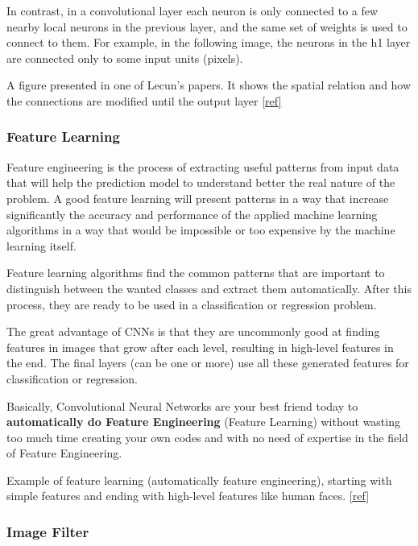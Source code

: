 \documentclass[11pt]{article}
\begin{document}
In contrast, in a convolutional layer each neuron is only connected to a
few nearby local neurons in the previous layer, and the same set of
weights is used to connect to them. For example, in the following image,
the neurons in the h1 layer are connected only to some input units
(pixels).

A figure presented in one of Lecun's papers. It shows the spatial
relation and how the connections are modified until the output layer
\href{http://help.sketchup.com/en}{{[}ref{]}} 

    \subsubsection{Feature Learning}\label{feature-learning}

Feature engineering is the process of extracting useful patterns from
input data that will help the prediction model to understand better the
real nature of the problem. A good feature learning will present
patterns in a way that increase significantly the accuracy and
performance of the applied machine learning algorithms in a way that
would be impossible or too expensive by the machine learning itself.

Feature learning algorithms find the common patterns that are important
to distinguish between the wanted classes and extract them
automatically. After this process, they are ready to be used in a
classification or regression problem.

The great advantage of CNNs is that they are uncommonly good at finding
features in images that grow after each level, resulting in high-level
features in the end. The final layers (can be one or more) use all these
generated features for classification or regression.

Basically, Convolutional Neural Networks are your best friend today to
\textbf{automatically do Feature Engineering} (Feature Learning) without
wasting too much time creating your own codes and with no need of
expertise in the field of Feature Engineering.

Example of feature learning (automatically feature engineering),
starting with simple features and ending with high-level features like
human faces.
\href{https://devblogs.nvidia.com/parallelforall/deep-learning-nutshell-core-concepts/}{{[}ref{]}}

    \subsubsection{Image Filter}\label{image-filter}
\end{document}
